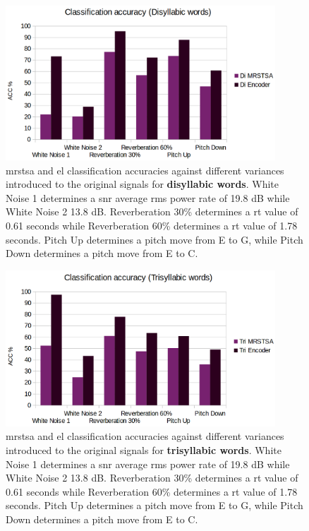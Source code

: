 \documentclass[10pt,letterpaper]{article}
\begin{document}
\begin{figure}[h!]
    \centering
    \includegraphics[width=0.9\textwidth]{DI_ACC.png}
    \caption{\gls{mrstsa} and \gls{el} classification accuracies against different variances introduced to the original signals
    for \textbf{disyllabic words}.
    White Noise 1 determines a \gls{snr} average \gls{rms} power rate of 19.8 dB while White Noise 2 13.8 dB.
    Reverberation 30\% determines a \gls{rt} value of 0.61 seconds while Reverberation 60\% determines a \gls{rt} value of 1.78 seconds.
    Pitch Up determines a pitch move from E to G, while Pitch Down determines a pitch move from E to C.}
    \label{fig:DI_ACC}
\end{figure}

\begin{figure}[h!]
    \centering
    \includegraphics[width=0.9\textwidth]{TRI_ACC.png}
    \caption{\gls{mrstsa} and \gls{el} classification accuracies against different variances introduced to the original signals
    for \textbf{trisyllabic words}.
    White Noise 1 determines a \gls{snr} average \gls{rms} power rate of 19.8 dB while White Noise 2 13.8 dB.
    Reverberation 30\% determines a \gls{rt} value of 0.61 seconds while Reverberation 60\% determines a \gls{rt} value of 1.78 seconds.
    Pitch Up determines a pitch move from E to G, while Pitch Down determines a pitch move from E to C.}
    \label{fig:TRI_ACC}
\end{figure}
\end{document}
